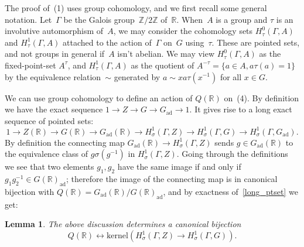 \documentclass[10pt,leqno]{article}
\newtheorem{lemma}[equation]{Lemma}
\newcommand{\kernel}{\mathrm{kernel}}
\newcommand{\Gad}{G_\mathrm{ad}}
\newcommand{\R}{\mathbb R}
\newcommand{\Z}{\mathbb Z}
\newcommand\inv{^{-1}}
\begin{document}
The proof of~(1) uses group cohomology, and we first recall some general notation. Let~$\Gamma$ be the Galois group~$\Z/2\Z$ of~$\R$. When~$A$ is a group and $\tau$ is an involutive automorphism of~$A$, we may consider the cohomology sets $H^0_\tau(\Gamma, A)$ and $H^1_\tau(\Gamma, A)$ attached to the action of~$\Gamma$ on~$G$ using~$\tau$.  These are pointed sets, and not groups in general if~$A$ isn't abelian. We may view $H^0_\tau(\Gamma, A)$ as the fixed-point-set $A^{\tau}$, and $H^1_\tau(\Gamma,A)$ as the quotient of $A^{-\tau} = \{ a \in A, a\tau(a)=1\}$ by the equivalence relation~$\sim$ generated by $a \sim x a \tau(x^{-1})$ for all $x \in G$. 

We can use group cohomology to define an action of $Q(\R)$ on~(4). By definition we have the exact sequence $1\rightarrow Z \rightarrow G \rightarrow \Gad\rightarrow 1$. It 
gives rise to a long exact sequence of pointed sets:
\begin{equation} \label{long_ptset}
1\rightarrow Z(\R) \rightarrow G(\R) \rightarrow \Gad(\R) \rightarrow H^1_\sigma(\Gamma,Z)\rightarrow H^1_\sigma(\Gamma,G)\rightarrow H^1_\sigma(\Gamma,\Gad).
\end{equation}
By definition the connecting map  $ \Gad(\R) \rightarrow H^1_\sigma(\Gamma,Z)$ sends $g \in \Gad(\R)$ to the equivalence class of $g \sigma(g^{-1})$ in $H^1_\sigma(\Gamma, Z)$. Going through the definitions we see that   two elements  $g_1, g_2$ have the same image if and only if $g_1 g_{2}\inv \in G(\R)_{\mathrm{ad}}$; therefore the image of the connecting map is in canonical bijection with $Q(\R)=\Gad(\R)/G(\R)_{\mathrm{ad}}$, and by exactness of~\eqref{long_ptset} we get:

\begin{lemma}
  \label{l:Q}
The above discussion determines a canonical bijection 
 \begin{equation}\label{bij_q_1} Q(\R) \leftrightarrow \kernel(H^1_\sigma(\Gamma,Z)\rightarrow H^1_\sigma(\Gamma,G)).\end{equation}
\end{lemma}
\end{document}
